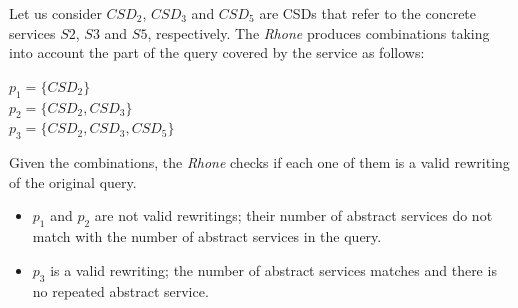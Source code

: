 Let us consider $CSD_{2}$, $CSD_{3}$ and $CSD_{5}$ are CSDs that refer to the concrete services $S2$, $S3$ and $S5$, respectively. The \textit{Rhone} produces combinations taking into account the part of the query covered by the service as follows:
\begin{flushleft}
$p_{1} = \lbrace CSD_{2} \rbrace$ \\
$p_{2} = \lbrace CSD_{2}, CSD_{3} \rbrace$ \\
$p_{3} = \lbrace CSD_{2}, CSD_{3}, CSD_{5} \rbrace$
\end{flushleft}
Given the combinations, the \textit{Rhone} checks if each one of them is a valid
rewriting of the original query.
\begin{itemize}
\item $p_{1}$ and $p_{2}$ are not valid rewritings; their number of abstract services do not match with the number of abstract services in the query.
\item $p_{3}$ is a valid rewriting; the number of abstract services matches and there is no repeated abstract service. 
\end{itemize}

	

